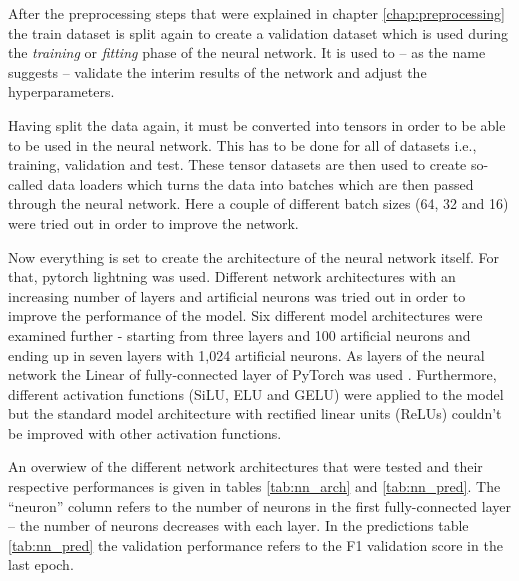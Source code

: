 After the preprocessing steps that were explained in chapter \ref{chap:preprocessing} the train dataset is split again to create a validation dataset which is used during the \textit{training} or \textit{fitting} phase of the neural network. It is used to -- as the name suggests -- validate the interim results of the network and adjust the hyperparameters. \citep[][p. 184]{TanPang-Ning2006}

Having split the data again, it must be converted into tensors in order to be able to be used in the neural network. This has to be done for all of datasets i.e., training, validation and test. These tensor datasets are then used to create so-called data loaders which turns the data into batches which are then passed through the neural network. Here a couple of different batch sizes (64, 32 and 16) were tried out in order to improve the network.

Now everything is set to create the architecture of the neural network itself. For that, pytorch lightning was used. Different network architectures with an increasing number of layers and artificial neurons was tried out in order to improve the performance of the model. Six different model architectures were examined further - starting from three layers and 100 artificial neurons and ending up in seven layers with 1,024 artificial neurons. As layers of the neural network the Linear of fully-connected layer of PyTorch was used \citep{PyTorch2019, PyTorch2021}. Furthermore, different activation functions (SiLU, ELU and GELU) were applied to the model but the standard model architecture with rectified linear units (ReLUs) couldn't be improved with other activation functions.

An overwiew of the different network architectures that were tested and their respective performances is given in tables \ref{tab:nn_arch} and \ref{tab:nn_pred}. The \enquote{neuron} column refers to the number of neurons in the first fully-connected layer -- the number of neurons decreases with each layer. In the predictions table \ref{tab:nn_pred} the validation performance refers to the F1 validation score in the last epoch.